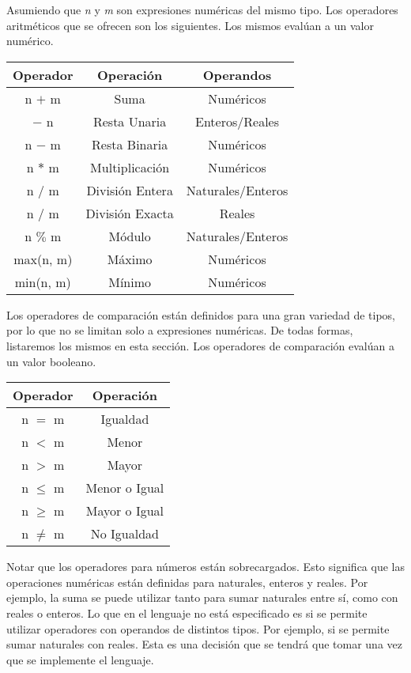 \documentclass{article}
\begin{document}
Asumiendo que \textit{n} y \textit{m} son expresiones numéricas del mismo tipo.
Los operadores aritméticos que se ofrecen son los siguientes.
Los mismos evalúan a un valor numérico.

\begin{center}
\begin{tabular}{| c | c | c |}
\hline
    Operador & Operación & Operandos\\
    \hline
    n $+$ m & Suma & Numéricos \\
    $-$ n & Resta Unaria & Enteros/Reales \\
    n $-$ m & Resta Binaria & Numéricos \\
    n $*$ m & Multiplicación & Numéricos \\
    n $/$ m & División Entera & Naturales/Enteros \\
    n $/$ m & División Exacta & Reales \\
    n $\%$ m & Módulo & Naturales/Enteros \\
    max(n, m) & Máximo & Numéricos \\
    min(n, m) & Mínimo & Numéricos \\
\hline
\end{tabular}
\end{center}

Los operadores de comparación están definidos para una gran variedad de tipos, por lo que no se limitan solo a expresiones numéricas.
De todas formas, listaremos los mismos en esta sección.
Los operadores de comparación evalúan a un valor booleano.

\begin{center}
\begin{tabular}{| c | c |}
\hline
    Operador & Operación \\
    \hline
    n $=$ m & Igualdad \\
    n $<$ m & Menor \\
    n $>$ m & Mayor \\
    n $\leq$ m & Menor o Igual \\
    n $\geq$ m & Mayor o Igual \\
    n $\neq$ m & No Igualdad \\
\hline
\end{tabular}
\end{center}

Notar que los operadores para números están sobrecargados.
Esto significa que las operaciones numéricas están definidas para naturales, enteros y reales.
Por ejemplo, la suma se puede utilizar tanto para sumar naturales entre sí, como con reales o enteros.
Lo que en el lenguaje no está especificado es si se permite utilizar operadores con operandos de distintos tipos.
Por ejemplo, si se permite sumar naturales con reales.
Esta es una decisión que se tendrá que tomar una vez que se implemente el lenguaje.
\end{document}
